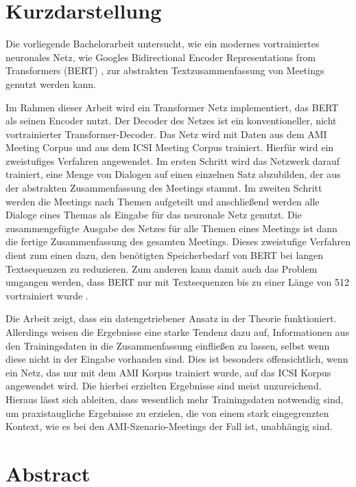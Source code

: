 \thispagestyle{empty}
\section*{Kurzdarstellung}
\label{sec:kurzdarstellung}

Die vorliegende Bachelorarbeit untersucht, wie ein modernes vortrainiertes neuronales Netz, wie \zB Googles Bidirectional Encoder Representations from Transformers (BERT) \cite{devlin2018bert}, zur abstrakten Textzusammenfassung von Meetings genutzt werden kann.

Im Rahmen dieser Arbeit wird ein Transformer Netz \cite{1706.03762} implementiert, das BERT als seinen Encoder nutzt.
Der Decoder des Netzes ist ein konventioneller, nicht vortrainierter Transformer-Decoder.
Das Netz wird mit Daten aus dem AMI Meeting Corpus \cite{Mccowan05theami} und aus dem ICSI Meeting Corpus \cite{Janin} trainiert.
Hierfür wird ein zweistufiges Verfahren angewendet.
Im ersten Schritt wird das Netzwerk darauf trainiert, eine Menge von Dialogen auf einen einzelnen Satz abzubilden, der aus der abstrakten Zusammenfassung des Meetings stammt.
Im zweiten Schritt werden die Meetings nach Themen aufgeteilt und anschließend werden alle Dialoge eines Themas als Eingabe für das neuronale Netz genutzt.
Die zusammengefügte Ausgabe des Netzes für alle Themen eines Meetings ist dann die fertige Zusammenfassung des gesamten Meetings.
Dieses zweistufige Verfahren dient zum einen dazu, den benötigten Speicherbedarf von BERT bei langen Textsequenzen zu reduzieren.
Zum anderen kann damit auch das Problem umgangen werden, dass BERT nur mit Textsequenzen bis zu einer Länge von 512 vortrainiert wurde \cite[p.~13]{devlin2018bert}.

Die Arbeit zeigt, dass ein datengetriebener Ansatz in der Theorie funktioniert.
Allerdings weisen die Ergebnisse eine starke Tendenz dazu auf, Informationen aus den Trainingsdaten in die Zusammenfassung einfließen zu lassen, selbst wenn diese nicht in der Eingabe vorhanden sind.
Dies ist besonders offensichtlich, wenn ein Netz, das nur mit dem AMI Korpus trainiert wurde, auf das ICSI Korpus angewendet wird.
Die hierbei erzielten Ergebnisse sind meist unzureichend.
Hieraus lässt sich ableiten, dass wesentlich mehr Trainingsdaten notwendig sind, um praxistaugliche Ergebnisse zu erzielen, die von einem stark eingegrenzten Kontext, wie es bei den AMI-Szenario-Meetings der Fall ist, unabhängig sind.

\section*{Abstract}
\label{sec:abstract}


